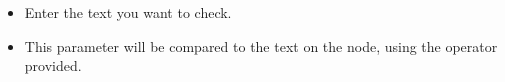 
\begin{itemize}
\item Enter the text you want to check. 
\item This parameter will be compared to the text on the node, using the operator provided.
\end{itemize}
